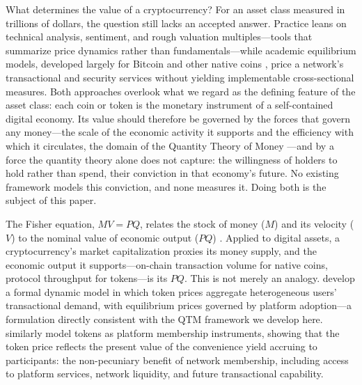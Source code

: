 \documentclass[12pt]{article}
\begin{document}
What determines the value of a cryptocurrency? For an asset class measured in
trillions of dollars, the question still lacks an accepted answer. Practice leans on
technical analysis, sentiment, and rough valuation multiples---tools that summarize
price dynamics rather than fundamentals---while academic equilibrium models, developed
largely for Bitcoin and other native coins \citep{pagnotta2022equilibrium,
biais2019blockchain, schilling2019bitcoin}, price a network's transactional and
security services without yielding implementable cross-sectional measures. Both
approaches overlook what we regard as the defining feature of the asset class: each
coin or token is the monetary instrument of a self-contained digital economy. Its
value should therefore be governed by the forces that govern any money---the scale of
the economic activity it supports and the efficiency with which it circulates, the
domain of the Quantity Theory of Money \citep{fisher1911}---and by a force the
quantity theory alone does not capture: the willingness of holders to hold rather
than spend, their conviction in that economy's future. No existing framework models
this conviction, and none measures it. Doing both is the subject of this paper.

The Fisher equation, $MV = PQ$, relates the stock of money ($M$) and its velocity ($V$)
to the nominal value of economic output ($PQ$) \citep{fisher1911}. Applied to digital
assets, a cryptocurrency's market capitalization proxies its money supply, and the
economic output it supports---on-chain transaction volume for native coins, protocol
throughput for tokens---is its $PQ$. This is not merely an analogy.
\citet{cong2021tokenomics} develop a formal dynamic model in which token prices aggregate
heterogeneous users' transactional demand, with equilibrium prices governed by platform
adoption---a formulation directly consistent with the QTM framework we develop here.
\citet{sockin2020model} similarly model tokens as platform membership instruments,
showing that the token price reflects the present value of the convenience yield accruing
to participants: the non-pecuniary benefit of network membership, including access to
platform services, network liquidity, and future transactional capability.
\end{document}
